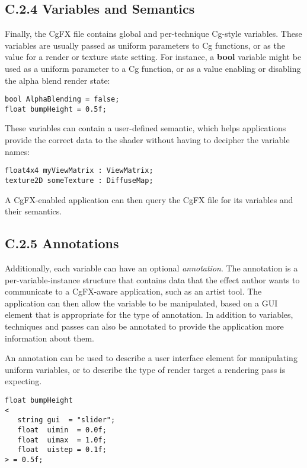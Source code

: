 \documentclass[../main.tex]{subfiles}
\begin{document}
\subsection{C.2.4 Variables and Semantics}

Finally, the CgFX file contains global and per-technique Cg-style variables. These variables are usually passed as uniform parameters to Cg functions, or as the value for a render or texture state setting. For instance, a \textbf{bool} variable might be used as a uniform parameter to a Cg function, or as a value enabling or disabling the alpha blend render state:

\FloatBarrier
\begin{lstlisting}
bool AlphaBlending = false;
float bumpHeight = 0.5f;
\end{lstlisting}
\FloatBarrier

These variables can contain a user-defined semantic, which helps applications provide the correct data to the shader without having to decipher the variable names:

\FloatBarrier
\begin{lstlisting}
float4x4 myViewMatrix : ViewMatrix;
texture2D someTexture : DiffuseMap;
\end{lstlisting}
\FloatBarrier

A CgFX-enabled application can then query the CgFX file for its variables and their semantics.

\subsection{C.2.5 Annotations}

Additionally, each variable can have an optional \textit{annotation}. The annotation is a per-variable-instance structure that contains data that the effect author wants to communicate to a CgFX-aware application, such as an artist tool. The application can then allow the variable to be manipulated, based on a GUI element that is appropriate for the type of annotation. In addition to variables, techniques and passes can also be annotated to provide the application more information about them.

An annotation can be used to describe a user interface element for manipulating uniform variables, or to describe the type of render target a rendering pass is expecting.

\FloatBarrier
\begin{lstlisting}
float bumpHeight
<
   string gui  = "slider";
   float  uimin  = 0.0f;
   float  uimax  = 1.0f;
   float  uistep = 0.1f;
> = 0.5f;
\end{lstlisting}
\FloatBarrier
\end{document}
